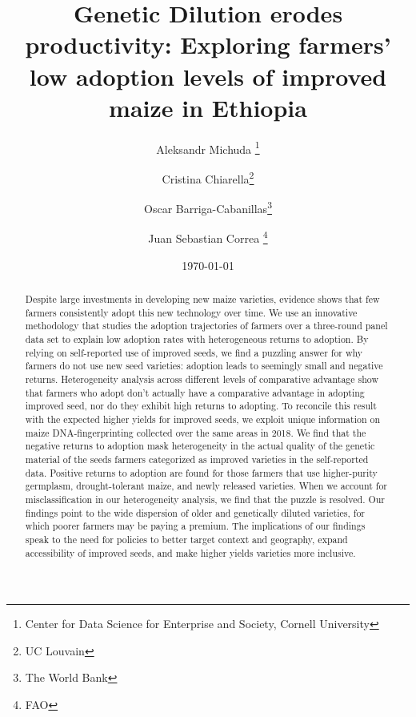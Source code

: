 \documentclass[11pt]{article}
\begin{document}
    \begin{titlepage}
    
    \title{Genetic Dilution erodes productivity: Exploring farmers' low adoption levels of improved maize in  Ethiopia}


\author{%
 Aleksandr Michuda \footnote{Center for Data Science for Enterprise and Society, Cornell University}%
 \and Cristina Chiarella\footnote{UC Louvain}%
 \and Oscar Barriga-Cabanillas\footnote{The World Bank}%
  \and Juan Sebastian Correa \footnote{FAO}%
  }
	\date{\today}

    \clearpage\maketitle
	\thispagestyle{empty}
	\vspace*{-2em}
    \begin{center}\begin{abstract}
			\noindent  
			Despite large investments in  developing new  maize varieties, evidence shows that few farmers consistently adopt this new technology over time. We use an innovative methodology that studies the adoption trajectories of farmers over a three-round panel data set to explain low adoption rates with heterogeneous returns to adoption. By relying on self-reported use of improved seeds, we find a puzzling answer for why farmers do not use new seed varieties: adoption leads to seemingly small and negative returns. Heterogeneity analysis across different levels of comparative advantage show that farmers who adopt don't actually have a comparative advantage in adopting improved seed, nor do they exhibit high returns to adopting. To reconcile this result with the expected higher yields for improved seeds, we exploit unique information on maize DNA-fingerprinting collected over the same areas in 2018. We find that the negative returns to adoption mask heterogeneity in the actual quality of the genetic material of the seeds farmers categorized as improved varieties in the self-reported data. Positive returns to adoption are found for those farmers that use higher-purity germplasm, drought-tolerant maize, and newly released varieties. When we account for misclassification in our heterogeneity analysis, we find that the puzzle is resolved. Our findings point to the wide dispersion of older and genetically diluted varieties, for which poorer farmers may be paying a premium. The implications of our findings speak to the need for policies to better target context and geography, expand accessibility of improved seeds, and make higher yields varieties more inclusive.
			

\end{abstract}
\end{center}
\end{titlepage}
\end{document}
